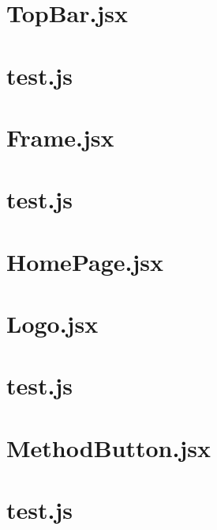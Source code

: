 \documentclass[a4paper,landscape]{report}
\begin{document}
\newpage
\section{TopBar.jsx}


\newpage
\section{test.js}


\newpage
\section{Frame.jsx}


\newpage
\section{test.js}


\newpage
\section{HomePage.jsx}


\newpage
\section{Logo.jsx}


\newpage
\section{test.js}


\newpage
\section{MethodButton.jsx}


\newpage
\section{test.js}

\end{document}
